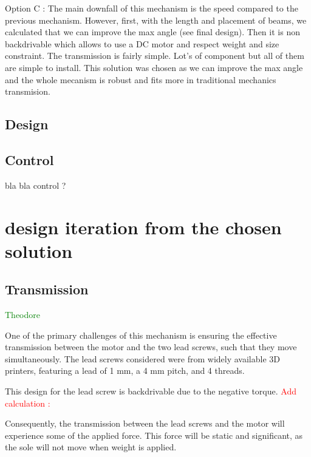 \documentclass[lettersize,journal]{IEEEtran}
\begin{document}
Option C : The main downfall of this mechanism is the speed compared to the previous mechanism. However, first, with the length and placement of beams, we calculated that we can improve the max angle (see final design). Then it is non backdrivable which allows to use a DC motor and respect weight and size constraint. The transmission  is fairly simple. Lot's of component but all of them are simple to install. This solution was chosen as we can improve the max angle and the whole mecanism is robust and fits more in traditional mechanics transmision.   



\subsection{Design}


\subsection{Control}

bla bla control ?

\section{design iteration from the chosen solution}



\subsection{Transmission} \textcolor{green}{Theodore}

One of the primary challenges of this mechanism is ensuring the effective transmission between the motor and the two lead screws, such that they move simultaneously. The lead screws considered were from widely available 3D printers, featuring a lead of 1 mm, a 4 mm pitch, and 4 threads.

This design for the lead screw is backdrivable due to the negative torque.
\textcolor{red}{Add calculation :}

Consequently, the transmission between the lead screws and the motor will experience some of the applied force. This force will be static and significant, as the sole will not move when weight is applied.
\end{document}

